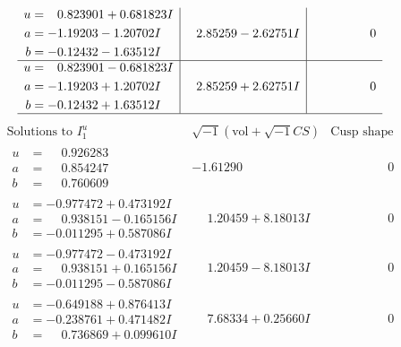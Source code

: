 \documentclass[1p]{elsarticle_modified}
\theoremstyle{definition}
\newcommand{\I}{\sqrt{-1}}
\begin{document}
$$\begin{array}{c|c|c}
\begin{aligned}
u &= \phantom{-}0.823901 + 0.681823 I \\
a &= -1.19203 - 1.20702 I \\
b &= -0.12432 - 1.63512 I\end{aligned}
 & \phantom{-}2.85259 - 2.62751 I & \phantom{-0.000000 } 0 \\ \hline\begin{aligned}
u &= \phantom{-}0.823901 - 0.681823 I \\
a &= -1.19203 + 1.20702 I \\
b &= -0.12432 + 1.63512 I\end{aligned}
 & \phantom{-}2.85259 + 2.62751 I & \phantom{-0.000000 } 0\\
 \hline 
 \end{array}$$\newpage$$\begin{array}{c|c|c}  
\text{Solutions to }I^u_{1}& \I (\text{vol} + \sqrt{-1}CS) & \text{Cusp shape}\\
 \hline 
\begin{aligned}
u &= \phantom{-}0.926283\phantom{ +0.000000I} \\
a &= \phantom{-}0.854247\phantom{ +0.000000I} \\
b &= \phantom{-}0.760609\phantom{ +0.000000I}\end{aligned}
 & -1.61290\phantom{ +0.000000I} & \phantom{-0.000000 } 0 \\ \hline\begin{aligned}
u &= -0.977472 + 0.473192 I \\
a &= \phantom{-}0.938151 - 0.165156 I \\
b &= -0.011295 + 0.587086 I\end{aligned}
 & \phantom{-}1.20459 + 8.18013 I & \phantom{-0.000000 } 0 \\ \hline\begin{aligned}
u &= -0.977472 - 0.473192 I \\
a &= \phantom{-}0.938151 + 0.165156 I \\
b &= -0.011295 - 0.587086 I\end{aligned}
 & \phantom{-}1.20459 - 8.18013 I & \phantom{-0.000000 } 0 \\ \hline\begin{aligned}
u &= -0.649188 + 0.876413 I \\
a &= -0.238761 + 0.471482 I \\
b &= \phantom{-}0.736869 + 0.099610 I\end{aligned}
 & \phantom{-}7.68334 + 0.25660 I & \phantom{-0.000000 } 0 \\ \hline\begin{aligned}

\end{aligned}
\end{array}$$
\end{document}
